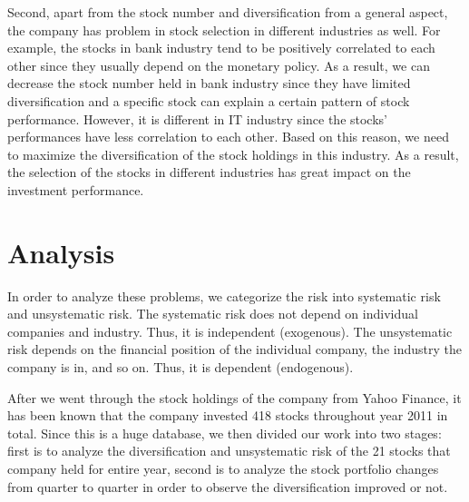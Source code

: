 \documentclass[oneside,12pt]{report}
\begin{document}
Second, apart from the stock number and diversification from a general aspect, the company has problem in stock selection in different industries as well. For example, the stocks in bank industry tend to be positively correlated to each other since they usually depend on the monetary policy. As a result, we can decrease the stock number held in bank industry since they have limited diversification and a specific stock can explain a certain pattern of stock performance. However, it is different in IT industry since the stocks’ performances have less correlation to each other. Based on this reason, we need to maximize the diversification of the stock holdings in this industry. As a result, the selection of the stocks in different industries has great impact on the investment performance. 


\chapter{Analysis}\label{Analysis}
In order to analyze these problems, we categorize the risk into systematic risk and unsystematic risk. The systematic risk does not depend on individual companies and industry. Thus, it is independent (exogenous). The unsystematic risk depends on the financial position of the individual company, the industry the company is in, and so on. Thus, it is dependent (endogenous). 

After we went through the stock holdings of the company from Yahoo Finance, it has been known that the company invested 418 stocks throughout year 2011 in total. Since this is a huge database, we then divided our work into two stages: first is to analyze the diversification and unsystematic risk of the 21 stocks that company held for entire year, second is to analyze the stock portfolio changes from quarter to quarter in order to observe the diversification improved or not. 


\end{document}

